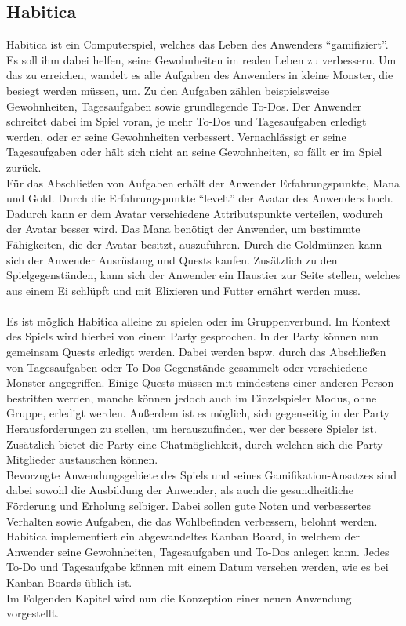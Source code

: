 \documentclass[sigconf, nonacm]{acmart}
\begin{document}
\subsection{Habitica}\label{sec:habitica}
Habitica ist ein Computerspiel, welches das Leben des Anwenders \enquote{gamifiziert}. Es soll ihm dabei helfen, seine Gewohnheiten im realen Leben zu verbessern. Um das zu erreichen, wandelt es alle Aufgaben des Anwenders in kleine Monster, die besiegt werden müssen, um. Zu den Aufgaben zählen beispielsweise Gewohnheiten, Tagesaufgaben sowie grundlegende To-Dos. Der Anwender schreitet dabei im Spiel voran, je mehr To-Dos und Tagesaufgaben erledigt werden, oder er seine Gewohnheiten verbessert. Vernachlässigt er seine Tagesaufgaben oder hält sich nicht an seine Gewohnheiten, so fällt er im Spiel zurück.
\\
Für das Abschließen von Aufgaben erhält der Anwender Erfahrungspunkte, Mana und Gold. Durch die Erfahrungspunkte \enquote{levelt} der Avatar des Anwenders hoch. Dadurch kann er dem Avatar verschiedene Attributspunkte verteilen, wodurch der Avatar besser wird. Das Mana benötigt der Anwender, um bestimmte Fähigkeiten, die der Avatar besitzt, auszuführen. Durch die Goldmünzen kann sich der Anwender Ausrüstung und Quests kaufen. Zusätzlich zu den Spielgegenständen, kann sich der Anwender ein Haustier zur Seite stellen, welches aus einem Ei schlüpft und mit Elixieren und Futter ernährt werden muss.
\\
\\
Es ist möglich Habitica alleine zu spielen oder im Gruppenverbund. Im Kontext des Spiels wird hierbei von einem Party gesprochen. In der Party können nun gemeinsam Quests erledigt werden. Dabei werden bspw. durch das Abschließen von Tagesaufgaben oder To-Dos Gegenstände gesammelt oder verschiedene Monster angegriffen. Einige Quests müssen mit mindestens einer anderen Person bestritten werden, manche können jedoch auch im Einzelspieler Modus, ohne Gruppe, erledigt werden. Außerdem ist es möglich, sich gegenseitig in der Party Herausforderungen zu stellen, um herauszufinden, wer der bessere Spieler ist. Zusätzlich bietet die Party eine Chatmöglichkeit, durch welchen sich die Party-Mitglieder austauschen können.
\\
Bevorzugte Anwendungsgebiete des Spiels und seines Gamifikation-Ansatzes sind dabei sowohl die Ausbildung der Anwender, als auch die gesundheitliche Förderung und Erholung selbiger. Dabei sollen gute Noten und verbessertes Verhalten sowie Aufgaben, die das Wohlbefinden verbessern, belohnt werden.~\cite{noauthor_funktionen_nodate}
\\
Habitica implementiert ein abgewandeltes Kanban Board, in welchem der Anwender seine Gewohnheiten, Tagesaufgaben und To-Dos anlegen kann. Jedes To-Do und Tagesaufgabe können mit einem Datum versehen werden, wie es bei Kanban Boards üblich ist. \\
Im Folgenden Kapitel wird nun die Konzeption einer neuen Anwendung vorgestellt.
\end{document}
